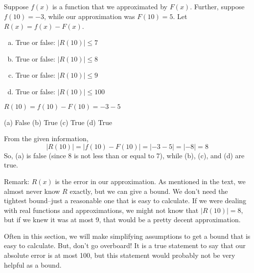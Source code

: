 %
%



\subsection*{\Conceptual}


\begin{Mquestion}
Suppose $f(x)$ is a function that we approximated by $F(x)$. Further, suppose
 $f(10)=-3$, while our approximation was $F(10)=5$. Let $R(x)=f(x)-F(x)$.
 \begin{enumerate}[(a)]
 \item True or false: $|R(10)| \leq 7$
 \item True or false: $|R(10)| \leq 8$
 \item True or false: $|R(10)| \leq 9$
  \item True or false: $|R(10)| \leq 100$
 \end{enumerate}
\end{Mquestion}
\begin{hint}
$R(10)=f(10)-F(10)=-3-5$
\end{hint}
\begin{answer} (a) False \qquad
(b) True \qquad
(c) True \qquad
(d) True
\end{answer}
\begin{solution}
From the given information,
\[|R(10)|=|f(10)-F(10)|=|-3-5|=|-8|=8\]
So, (a) is false (since 8 is not less than or equal to 7), while (b), (c), and (d) are true.

Remark: $R(x)$ is the error in our approximation. As mentioned in the text, we almost never know $R$ exactly, but we can give a bound. We don't need the tightest bound--just a reasonable one that is easy to calculate. If we were dealing with real functions and approximations, we might not know that $|R(10)|=8$, but if we knew it was at most 9, that would be a pretty decent approximation.

 Often in this section, we will make simplifying assumptions to get a bound that is easy to calculate. But, don't go overboard! It is a true statement to say that our absolute error is at most 100, but this statement would probably not be very helpful as a bound.
\end{solution}



